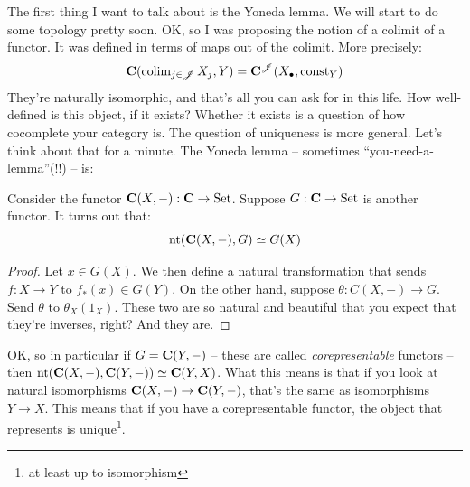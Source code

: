 The first thing I want to talk about is the Yoneda lemma. We will start to do some topology pretty soon. OK, so I was proposing the notion of a colimit of a functor. It was defined in terms of maps out of the colimit. More precisely:
$$\mathbf C(\operatorname{colim}_{j\in\mathscr J}X_j,Y) = \mathbf C^\mathscr J(X_\bullet,\mathrm{const}_Y)$$
They're naturally isomorphic, and that's all you can ask for in this life. How well-defined is this object, if it exists? Whether it exists is a question of how cocomplete your category is. The question of uniqueness is more general. Let's think about that for a minute. The Yoneda lemma -- sometimes ``you-need-a-lemma''(!!) -- is:
\begin{theorem}
    Consider the functor $\mathbf C(X,-):\mathbf C\to{\mathrm{Set}}$. Suppose $G:\mathbf C\to{\mathrm{Set}}$ is another functor. It turns out that:
    $$\mathrm{nt}(\mathbf C(X,-),G)\simeq G(X)$$
\end{theorem}
\begin{proof}
    Let $x\in G(X)$. We then define a natural transformation that sends $f:X\to Y$ to $f_\ast(x)\in G(Y)$. On the other hand, suppose $\theta:C(X,-)\to G$. Send $\theta$ to $\theta_X(1_X)$. These two are so natural and beautiful that you expect that they're inverses, right? And they are.
\end{proof}
OK, so in particular if $G=\mathbf C(Y,-)$ -- these are called \emph{corepresentable} functors -- then $\mathrm{nt}(\mathbf C(X,-),\mathbf C(Y,-))\simeq \mathbf C(Y,X)$. What this means is that if you look at natural isomorphisms $\mathbf C(X,-)\to \mathbf C(Y,-)$, that's the same as isomorphisms $Y\to X$. This means that if you have a corepresentable functor, the object that represents is unique\footnote{at least up to isomorphism}.

